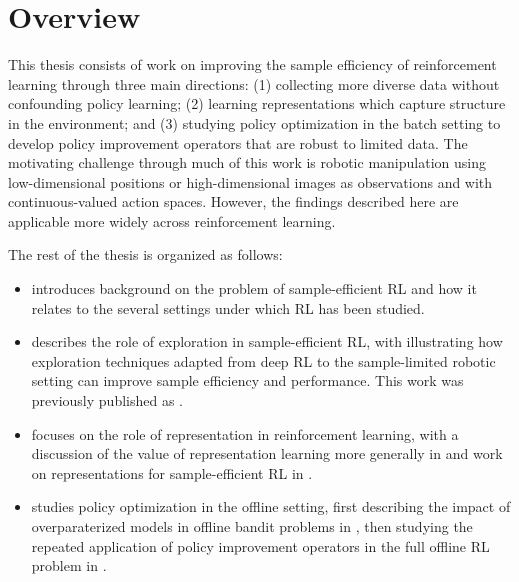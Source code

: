 \section{Overview}

This thesis consists of work on improving the sample efficiency of reinforcement learning through three main directions: (1) collecting more diverse data without confounding policy learning; (2) learning representations which capture structure in the environment; and (3) studying policy optimization in the batch setting to develop policy improvement operators that are robust to limited data.
The motivating challenge through much of this work is robotic manipulation using low-dimensional positions or high-dimensional images as observations and with continuous-valued action spaces.
However, the findings described here are applicable more widely across reinforcement learning.

The rest of the thesis is organized as follows:
\begin{itemize}
    \item {} introduces background on the problem of sample-efficient RL and how it relates to the several settings under which RL has been studied.
    \item {} describes the role of exploration in sample-efficient RL, with  illustrating how exploration techniques adapted from deep RL to the sample-limited robotic setting can improve sample efficiency and performance. This work was previously published as \citet{whitney2021rethinking}.
    \item {} focuses on the role of representation in reinforcement learning, with a discussion of the value of representation learning more generally in  \citep{whitney2021evaluating} and work on representations for sample-efficient RL in  \citep{Whitney2020Dynamics-Aware}.
    \item {} studies policy optimization in the offline setting, first describing the impact of overparaterized models in offline bandit problems in  \citep{brandfonbrener2021offlinecontextual}, then studying the repeated application of policy improvement operators in the full offline RL problem in  \citep{brandfonbrener2021offlinerl}.
\end{itemize}









\printendnotes
